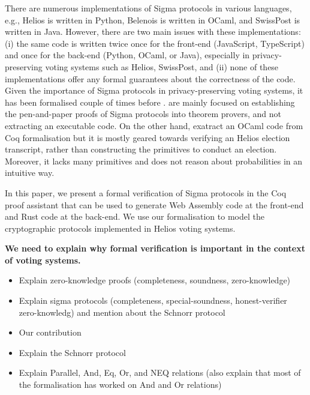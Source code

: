 \documentclass[sigconf]{acmart}
\begin{document}
There are numerous implementations of Sigma protocols in various languages, 
e.g., Helios is written in Python, Belenois is written in OCaml, and SwissPost is written in Java.
However, there are two main issues with these implementations: (i)  
the same code is written twice 
once for the front-end (JavaScript, TypeScript) and once for the back-end (Python, OCaml, or Java),
especially in privacy-preserving voting systems such as Helios, SwissPost, and 
(ii) none of these implementations offer any formal guarantees about the correctness of the code.
Given the importance of Sigma protocols in privacy-preserving voting systems,
it has been formalised couple of times before  \cite{5552642,butler2019formalisation,10.1145/3319535.3354247}. 
\cite{5552642,butler2019formalisation} are mainly focused on establishing the 
pen-and-paper proofs of Sigma protocols into theorem provers, and not extracting an executable code.
On the other hand, \cite{10.1145/3319535.3354247} exatract an OCaml code from Coq 
formalisation but it is mostly geared towards verifying an Helios election transcript, 
rather than constructing the primitives to conduct an election. Moreover, 
it lacks many primitives and does not reason about probabilities in an intuitive way.


In this paper, we present a formal verification of Sigma protocols in the Coq proof assistant that 
can be used to generate Web Assembly code at the front-end and Rust code at the back-end. 
We use our formalisation to model the cryptographic protocols implemented in Helios voting systems. 





\textbf{We need to explain why formal verification is important in the context of voting systems.}

\begin{itemize}
  \item Explain zero-knowledge proofs (completeness, soundness, zero-knowledge)
  \item Explain sigma protocols (completeness, special-soundness, honest-verifier zero-knowledg) 
  and mention about the Schnorr protocol
  \item Our contribution
  \item Explain the Schnorr protocol
  \item Explain Parallel, And, Eq, Or, and NEQ relations (also explain that 
  most of the formalisation has worked on And and Or relations)
\end{itemize}
\end{document}
